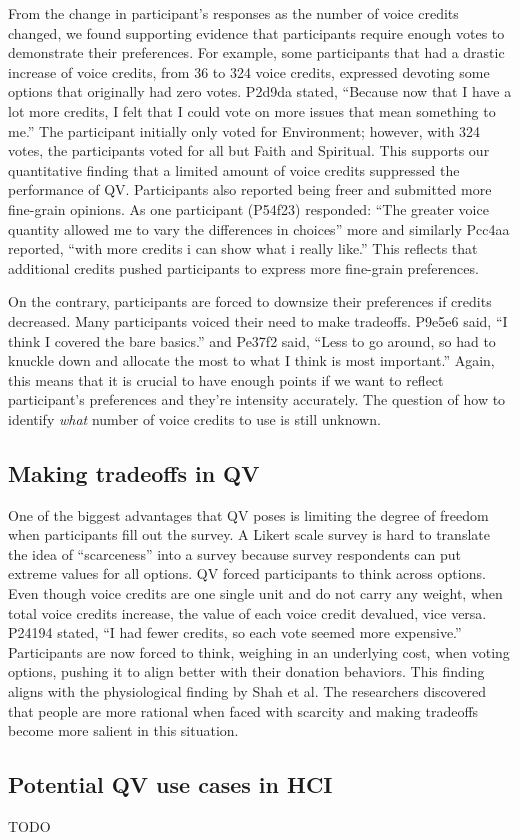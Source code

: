 From the change in participant's responses as the number of voice credits changed, we found supporting evidence that participants require enough votes to demonstrate their preferences.
For example, some participants that had a drastic increase of voice credits, from 36 to 324 voice credits, expressed devoting some options that originally had zero votes. 
P2d9da stated, ``Because now that I have a lot more credits, I felt that I could vote on more issues that mean something to me.'' The participant initially only voted for Environment; however, with 324 votes, the participants voted for all but Faith and Spiritual. This supports our quantitative finding that a limited amount of voice credits suppressed the performance of QV. Participants also reported being freer and submitted more fine-grain opinions. As one participant (P54f23) responded: ``The greater voice quantity allowed me to vary the differences in choices'' more and similarly Pcc4aa reported, ``with more credits i can show what i really like.''
This reflects that additional credits pushed participants to express more fine-grain preferences.

On the contrary, participants are forced to downsize their preferences if credits decreased. Many participants voiced their need to make tradeoffs. P9e5e6 said, ``I think I covered the bare basics.'' and Pe37f2 said, ``Less to go around, so had to knuckle down and allocate the most to what I think is most important.'' 
Again, this means that it is crucial to have enough points if we want to reflect participant's preferences and they're intensity accurately.
The question of how to identify \textit{what} number of voice credits to use is still unknown.

\subsection{Making tradeoffs in QV}
One of the biggest advantages that QV poses is limiting the degree of freedom when participants fill out the survey.
A Likert scale survey is hard to translate the idea of ``scarceness'' into a survey because survey respondents can put extreme values for all options. 
QV forced participants to think across options. 
Even though voice credits are one single unit and do not carry any weight, when total voice credits increase, the value of each voice credit devalued, vice versa. P24194 stated, ``I had fewer credits, so each vote seemed more expensive.''
Participants are now forced to think, weighing in an underlying cost, when voting options, pushing it to align better with their donation behaviors.
This finding aligns with the physiological finding by Shah et al. \cite{Shah2015a}
The researchers discovered that people are more rational when faced with scarcity and making tradeoffs become more salient in this situation.

\subsection{Potential QV use cases in HCI}
TODO

